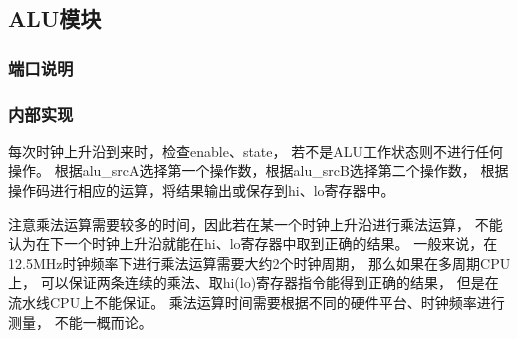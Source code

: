     \subsection{ALU模块}
        \subsubsection{端口说明}
            
        \subsubsection{内部实现}
            每次时钟上升沿到来时，检查enable、state，%
            若不是ALU工作状态则不进行任何操作。%
            根据alu\_srcA选择第一个操作数，根据alu\_srcB选择第二个操作数，%
            根据操作码进行相应的运算，将结果输出或保存到hi、lo寄存器中。

            注意乘法运算需要较多的时间，因此若在某一个时钟上升沿进行乘法运算，%
            不能认为在下一个时钟上升沿就能在hi、lo寄存器中取到正确的结果。%
            一般来说，在12.5MHz时钟频率下进行乘法运算需要大约2个时钟周期，%
            那么如果在多周期CPU上，%
            可以保证两条连续的乘法、取hi(lo)寄存器指令能得到正确的结果，%
            但是在流水线CPU上不能保证。%
            乘法运算时间需要根据不同的硬件平台、时钟频率进行测量，%
            不能一概而论。
